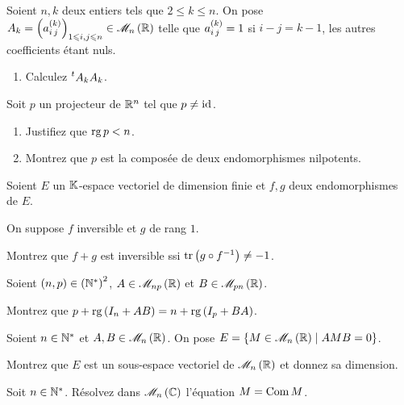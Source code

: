 \begin{corr}
\end{corr}

\begin{exo}
Soient \(n,k\) deux entiers tels que \(2\leq k\leq n\). On pose \(A_k=\paren{a_{i\,j}\deriv{k}}_{1\leq i,j\leq n}\in\M{n}[\R]\) telle que \(a_{i\,j}^{\left(k\right)}=1\) si \(i-j=k-1\), les autres coefficients étant nuls.

\begin{enumerate}[series=oral4.7]
    \item Calculez \(\prescript{t}{}{A_k}A_k\).
\end{enumerate}

Soit \(p\) un projecteur de \(\mathbb{R}^n\) tel que \(p\not=\mathrm{id}_{}\).

\begin{enumerate}[resume=oral4.7]
    \item Justifiez que \(\operatorname{rg} p<n\). \\
    \item Montrez que \(p\) est la composée de deux endomorphismes nilpotents.
\end{enumerate}
\end{exo}

\begin{corr}
\end{corr}

\begin{exo}
Soient \(E\) un \(\mathbb{K}\)-espace vectoriel de dimension finie et \(f,g\) deux endomorphismes de \(E\).

On suppose \(f\) inversible et \(g\) de rang \(1\).

Montrez que \(f+g\) est inversible ssi \(\operatorname{tr}\left(g\circ f^{-1}\right)\not=-1\).
\end{exo}

\begin{corr}
\end{corr}

\begin{exo}
Soient \(\left(n,p\right)\in\left(\mathbb{N}^*\right)^2\), \(A\in\M{np}[\R]\) et \(B\in\M{pn}[\R]\).

Montrez que \(p+\operatorname{rg}\left(I_n+AB\right)=n+\operatorname{rg}\left(I_p+BA\right)\).
\end{exo}

\begin{corr}
\end{corr}

\begin{exo}
Soient \(n\in\mathbb{N}^*\) et \(A,B\in\M{n}[\R]\). On pose \(E=\accol{M\in\M{n}[\R]\tq AMB=0}\).

Montrez que \(E\) est un sous-espace vectoriel de \(\M{n}[\R]\) et donnez sa dimension.
\end{exo}

\begin{corr}
\end{corr}

\begin{exo}
Soit \(n\in\mathbb{N}^*\). Résolvez dans \(\M{n}[\C]\) l'équation \(M=\operatorname{Com}M\).
\end{exo}

\begin{corr}
\end{corr}
